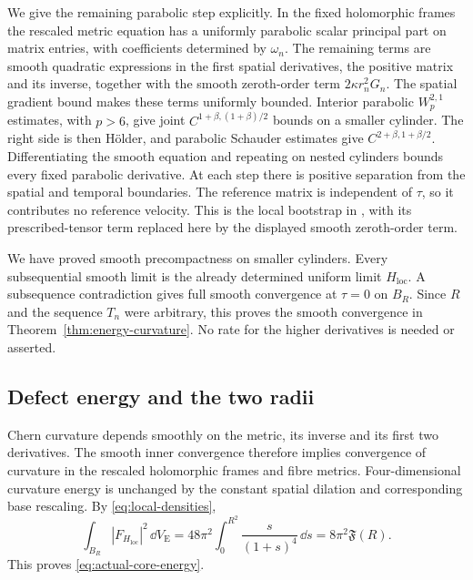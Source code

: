 We give the remaining parabolic step explicitly.
In the fixed holomorphic frames the rescaled metric
equation has a uniformly parabolic scalar principal
part on matrix entries, with coefficients determined
by \(\omega_n\). The remaining terms are smooth
quadratic expressions in the first spatial derivatives,
the positive matrix and its inverse, together with
the smooth zeroth-order term \(2\kappa r_n^2G_n\).
The spatial gradient bound makes these terms uniformly
bounded. Interior parabolic \(W^{2,1}_p\) estimates,
with \(p>6\), give joint
\(C^{1+\beta,(1+\beta)/2}\) bounds on a smaller
cylinder. The right side is then Hölder, and
parabolic Schauder estimates give
\(C^{2+\beta,1+\beta/2}\). Differentiating the smooth
equation and repeating on nested cylinders bounds
every fixed parabolic derivative. At each step there
is positive separation from the spatial and temporal
boundaries. The reference matrix is independent of
\(\tau\), so it contributes no reference velocity.
This is the local bootstrap in
\cite[proof of Theorem~2.5, (2.53)--(2.59)]{XiongYangYau26},
with its prescribed-tensor term replaced here by
the displayed smooth zeroth-order term.

We have proved smooth precompactness on smaller
cylinders. Every subsequential smooth limit is the
already determined uniform limit \(H_{\mathrm{loc}}\).
A subsequence contradiction gives full smooth
convergence at \(\tau=0\) on \(B_R\). Since \(R\)
and the sequence \(T_n\) were arbitrary, this proves
the smooth convergence in Theorem~\ref{thm:energy-curvature}.
No rate for the higher derivatives is needed or asserted.

\subsection{Defect energy and the two radii}

Chern curvature depends smoothly on the metric, its inverse
and its first two derivatives. The smooth inner convergence
therefore implies convergence of curvature in the rescaled
holomorphic frames and fibre metrics. Four-dimensional
curvature energy is unchanged by the constant spatial
dilation and corresponding base rescaling. By
\eqref{eq:local-densities},
\[
 \int_{B_R}|F_{H_{\mathrm{loc}}}|^2\,\dd V_{\mathrm E}
 =48\pi^2\int_0^{R^2}\frac{s}{(1+s)^4}\,\dd s
 =8\pi^2\mathfrak F(R).
\]
This proves \eqref{eq:actual-core-energy}.

